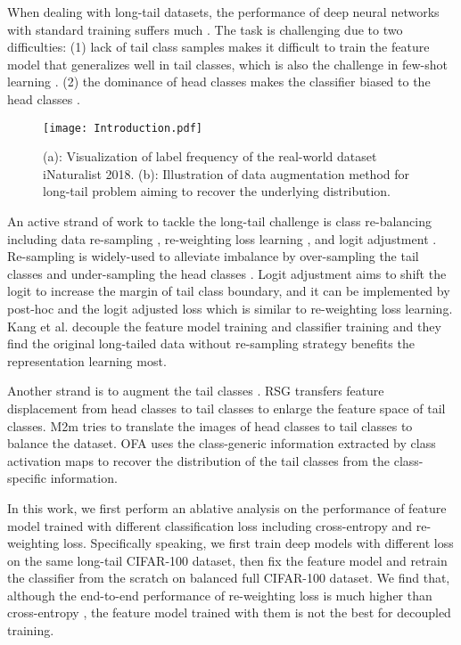 \documentclass[runningheads]{llncs}
\begin{document}
When dealing with long-tail datasets, the performance of deep neural networks with standard training suffers much \cite{liu2019large,wang2019dynamic}. The task is challenging due to two difficulties: (1) lack of tail class samples makes it difficult to train the feature model that generalizes well in tail classes, which is also the challenge in few-shot learning \cite{yang2021free,dhillon2019baseline,cao2019theoretical}. (2) the dominance of head classes makes the classifier biased to the head classes \cite{kang2019decoupling}. 


\begin{figure}
\centering
\texttt{[image: Introduction.pdf]}
\vspace{-3mm}
\caption{(a): Visualization of label frequency of the real-world dataset iNaturalist 2018. (b): Illustration of data augmentation method for long-tail problem aiming to recover the underlying distribution.}
\label{fig:Introduction}
\end{figure}



An active strand of work to tackle the long-tail challenge is class re-balancing including data re-sampling \cite{cai2021ace,wang2020devil}, re-weighting loss learning \cite{cui2019class,wang2021seesaw}, and logit adjustment \cite{menon2020long}. Re-sampling is widely-used to alleviate imbalance by over-sampling the tail classes and under-sampling the head classes \cite{chawla2002smote,dablain2022deepsmote}. Logit adjustment aims to shift the logit to increase the margin of tail class boundary, and it can be implemented by post-hoc and the logit adjusted loss which is similar to re-weighting loss learning. Kang et al. \cite{kang2019decoupling} decouple the feature model  training and classifier training and they find the original long-tailed data without re-sampling strategy benefits the representation learning most. 

Another strand is to augment the tail classes \cite{yin2019feature,kim2020m2m,liu2020deep}. RSG \cite{wang2021rsg} transfers feature displacement from head classes to tail classes to enlarge the feature space of tail classes. M2m \cite{kim2020m2m} tries to translate the images of head classes to tail classes to balance the dataset. OFA \cite{chu2020feature} uses the class-generic information extracted by class activation maps to recover the distribution of the tail classes from the class-specific information. 


In this work, we first perform an ablative analysis on the performance of feature model trained with different classification loss including cross-entropy and re-weighting loss. Specifically speaking, we first train deep models with different loss on the same long-tail CIFAR-100 dataset, then fix the feature model and retrain the classifier from the scratch on balanced full CIFAR-100 dataset. We find that, although the end-to-end performance of re-weighting loss is much higher than cross-entropy \cite{cao2019learning,menon2020long,ren2020balanced}, the feature model trained with them is not the best for decoupled training. 
\end{document}
